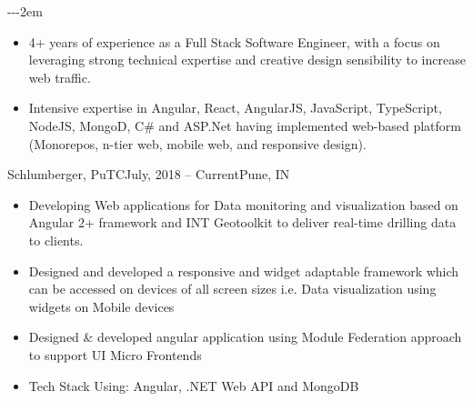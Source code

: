 \documentclass[9pt,a4paper,ragged2e, normalphoto]{altacv}
\makeatletter
\renewcommand{\makecvheader}{%
  \begingroup
    \begin{minipage}{0.7\linewidth} %
      \raggedright\color{emphasis}%
      {\Huge\bfseries\MakeUppercase{\@name}\par}
      \medskip
      {\large\bfseries\color{accent}\@tagline\par}
    \end{minipage}
    \hfill
    \begin{minipage}{0.25\linewidth} %
      {\raggedright\small\bfseries\@personalinfo\par}
    \end{minipage}
  \endgroup\medskip
}
\renewenvironment{fullwidth}{%
  \begin{adjustwidth}{}
  {\dimexpr-\marginparwidth-\marginparsep-2em\relax} %
  }
  {\end{adjustwidth}}
\makeatother
\begin{document}
\name\fontsize{11pt}{SHLOK NANGIA}

\begin{fullwidth}
\makecvheader
\end{fullwidth}



\begin{itemize}
    \item 4+ years of experience as a Full Stack Software Engineer, with a focus on leveraging strong technical expertise and creative design sensibility to increase web traffic. 
    \item Intensive expertise in Angular, React, AngularJS, JavaScript, TypeScript, NodeJS, MongoD, C\# and ASP.Net having implemented web-based platform (Monorepos, n-tier web, mobile web, and responsive design).
\end{itemize}


 {Schlumberger, PuTC}{July, 2018 -- Current}{Pune, IN}{}{}
\begin{itemize}
 \item Developing Web applications for Data monitoring and visualization based on Angular	2+ framework and INT Geotoolkit to deliver real-time drilling data to clients.
 \item Designed and developed a responsive and widget adaptable framework which can be accessed on devices of all screen sizes i.e. Data visualization using widgets on Mobile devices
 \item Designed \& developed angular application using Module Federation approach to support UI Micro Frontends
 \item Tech Stack Using: Angular, .NET Web API and MongoDB
\end{itemize}
\end{document}
